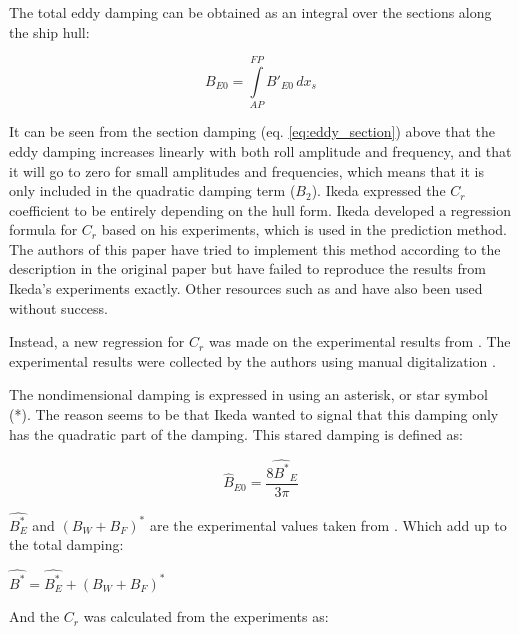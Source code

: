 \quad     

\quad     The total eddy damping can be obtained as an integral over the sections
along the ship hull:
 
            
    
    \begin{equation}
B_{E0} = \int\limits_{AP}^{FP} B'_{E0}\, dx_{s}
\label{eq:eddy_integration}
\end{equation}

\quad     

\quad     It can be seen from the section damping (eq.
\ref{eq:eddy_section}) above that the eddy damping increases
linearly with both roll amplitude and frequency, and that it will go to
zero for small amplitudes and frequencies, which means that it is only
included in the quadratic damping term ($B_2$). Ikeda expressed the
$C_r$ coefficient to be entirely depending on the hull form. Ikeda
developed a regression formula for $C_r$ based on his experiments,
which is used in the prediction method. The authors of this paper have
tried to implement this method according to the description in the
original paper \citep{7505983/4AFVVGNT} but have failed to reproduce the
results from Ikeda's experiments exactly. Other resources such as
\citep{7505983/FB64RGPF} and \citep{7505983/KAKIM2E2} have also been used
without success.

\quad Instead, a new regression for $C_r$ was made on the experimental
results from \citep{7505983/4AFVVGNT}. The experimental results were
collected by the authors using manual digitalization
\citep{7505983/RXYIE6UW}.

\quad     The nondimensional damping is expressed in \citep{7505983/4AFVVGNT} using
an asterisk, or star symbol (*). The reason seems to be that Ikeda
wanted to signal that this damping only has the quadratic part of the
damping. This stared damping is defined as:
 
            
    
    \begin{equation}
\hat{B}_{E0} = \frac{8 \hat{B^*}_{E}}{3 \pi}
\label{eq:B_E_star_hat}
\end{equation}

\quad     

\quad     $\hat{B_E^*}$ and $(B_W+B_F)^*$ are the experimental values taken
from \citep{7505983/4AFVVGNT}. Which add up to the total damping:

\quad     $\hat{B^*} = \hat{B^*_E} + (B_W+B_F)^*$

\quad     And the $C_r$ was calculated from the experiments as:
 
